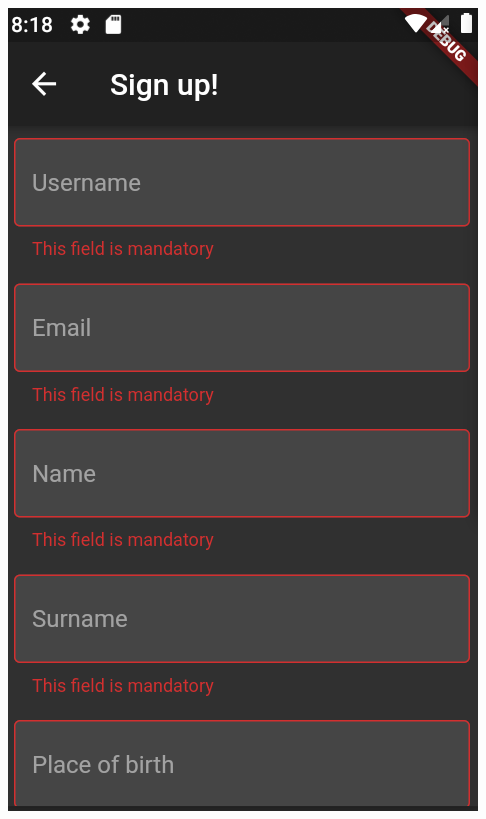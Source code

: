 \documentclass[../ATD.tex]{subfiles}
\begin{document}
\begin{itemize}
        \includegraphics[scale = 0.3]{assets/mandatorySignup.png}
    \end{itemize}
\end{document}
